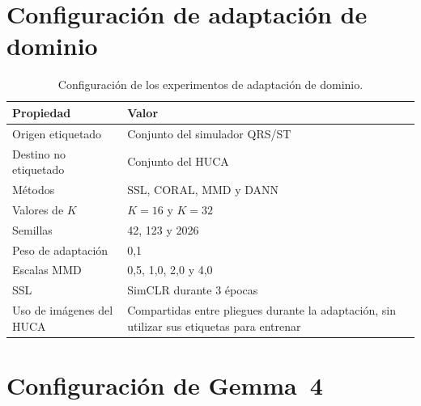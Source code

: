 \section{Configuración de adaptación de dominio}

\begin{table}[H]
  \centering
  \small
  \begin{tabularx}{0.94\textwidth}{p{4.4cm}X}
    \toprule
    Propiedad & Valor \\
    \midrule
    Origen etiquetado & Conjunto del simulador QRS/ST \\
    Destino no etiquetado & Conjunto del HUCA \\
    Métodos & SSL, CORAL, MMD y DANN \cite{chen2020simclr,sun2016deepcoral,long2015dan,ganin2016} \\
    Valores de \(K\) & \(K=16\) y \(K=32\) \\
    Semillas & 42, 123 y 2026 \\
    Peso de adaptación & 0,1 \\
    Escalas MMD & 0,5, 1,0, 2,0 y 4,0 \\
    SSL & SimCLR durante 3 épocas \\
    Uso de imágenes del HUCA & Compartidas entre pliegues durante la adaptación, sin utilizar sus etiquetas para entrenar \\
    \bottomrule
  \end{tabularx}
  \caption{Configuración de los experimentos de adaptación de dominio.}
  \label{tab:config_domain_appendix}
  \label{tab:cnn_domain_methods}
\end{table}

\section{Configuración de Gemma~4}

